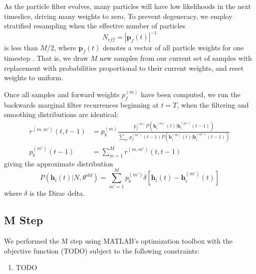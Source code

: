 \documentclass{article}
\begin{document}
As the particle filter evolves, many particles will have low
likelihoods in the next timeslice, driving many weights to zero.
To prevent degeneracy, we employ stratified resampling when the
effective number of particles
\begin{equation} \label{Neff}
N_{eff} = \left|\mathbf{p}_f(t)\right|^{-1}
\end{equation}
is less than $M/2$, where $\mathbf{p}_f(t)$ denotes a vector of all
particle weights for one timestep \citep{volgelstein2009}. That is,
we draw $M$ new samples from our current set of samples with
replacement with probabilities proportional to their current weights,
and reset weights to uniform.

Once all samples and forward weights $p_f^(m)$ have been computed,
we run the backwards marginal filter recurrences beginning at $t=T$,
when the filtering and smoothing distributions are identical:
\begin{align}
r^{(m,m')}(t, t - 1) &= p_b^{(m)}\frac{p_f^{(m)}P(\mathbf{h}_i^{(m)}(t)|\mathbf{h}_i^{(m')}(t - 1))}{\sum_{m'} p_f^{(m')}(t - 1) P(\mathbf{h}_i^{(m)}(t)|\mathbf{h}_i^{(m')}(t - 1))} \\
p_b^{(m')}(t - 1)    &= \sum_{m=1}^M r^{(m,m')}(t, t - 1)
\end{align}
giving the approximate distribution
\begin{equation} \label{Ph}
P(\mathbf{h}_i(t) | N, \theta^{old}) = \sum_{m'=1}^{M} p_b^{(m')} \delta\left[\mathbf{h}_i(t) - \mathbf{h}_i^{(m')}(t)\right]
\end{equation}
where $\delta$ is the Dirac delta.

\subsection{M Step}
We performed the M step using MATLAB's optimization toolbox with the
objective function (TODO) subject to the following constraints:
\begin{enumerate}
\item TODO
\end{enumerate}
\end{document}
